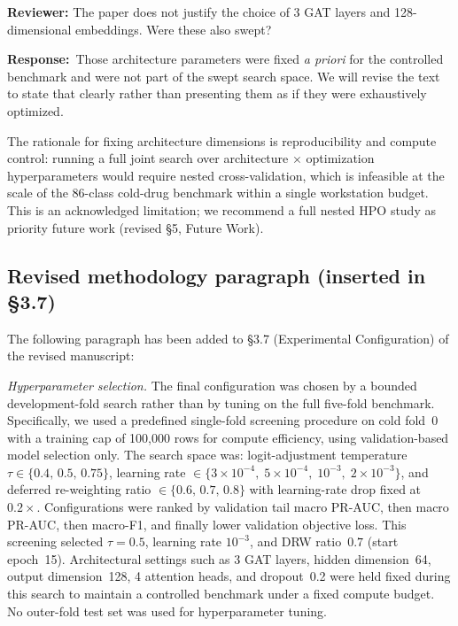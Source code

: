\documentclass[11pt,a4paper]{article}
\newcommand{\reviewer}[1]{\textbf{\textcolor{reviewerbar}{Reviewer:}} #1}
\newcommand{\authorlabel}{\textbf{\textcolor{authorbar}{Response:}}}
\begin{document}
\begin{reviewerbox}
\reviewer{The paper does not justify the choice of 3 GAT layers and 128-dimensional
embeddings.
Were these also swept?}
\end{reviewerbox}

\begin{authorbox}
\authorlabel\
Those architecture parameters were fixed \emph{a priori} for the controlled
benchmark and were not part of the swept search space.
We will revise the text to state that clearly rather than presenting them as if
they were exhaustively optimized.

The rationale for fixing architecture dimensions is reproducibility and compute
control: running a full joint search over architecture $\times$ optimization
hyperparameters would require nested cross-validation, which is infeasible at the
scale of the 86-class cold-drug benchmark within a single workstation budget.
This is an acknowledged limitation; we recommend a full nested HPO study as
priority future work (revised \S5, Future Work).
\end{authorbox}

\subsection{Revised methodology paragraph (inserted in \S3.7)}

The following paragraph has been added to \S3.7 (Experimental Configuration)
of the revised manuscript:

\begin{mdframed}[backgroundcolor=gray!8, linewidth=0pt,
                 innerleftmargin=12pt, innerrightmargin=12pt,
                 innertopmargin=8pt, innerbottommargin=8pt]
\noindent\textit{Hyperparameter selection.}
The final configuration was chosen by a bounded development-fold search rather
than by tuning on the full five-fold benchmark.
Specifically, we used a predefined single-fold screening procedure on cold fold~0
with a training cap of 100{,}000 rows for compute efficiency, using
validation-based model selection only.
The search space was:
logit-adjustment temperature $\tau \in \{0.4,\,0.5,\,0.75\}$,
learning rate $\in \{3\!\times\!10^{-4},\;5\!\times\!10^{-4},\;10^{-3},\;2\!\times\!10^{-3}\}$,
and deferred re-weighting ratio $\in \{0.6,\,0.7,\,0.8\}$ with
learning-rate drop fixed at $0.2\times$.
Configurations were ranked by validation tail macro PR-AUC, then macro PR-AUC,
then macro-F1, and finally lower validation objective loss.
This screening selected $\tau=0.5$, learning rate $10^{-3}$, and DRW ratio~$0.7$
(start epoch~15).
Architectural settings such as 3 GAT layers, hidden dimension~64, output
dimension~128, 4 attention heads, and dropout~0.2 were held fixed during this
search to maintain a controlled benchmark under a fixed compute budget.
No outer-fold test set was used for hyperparameter tuning.
\end{mdframed}
\end{document}
